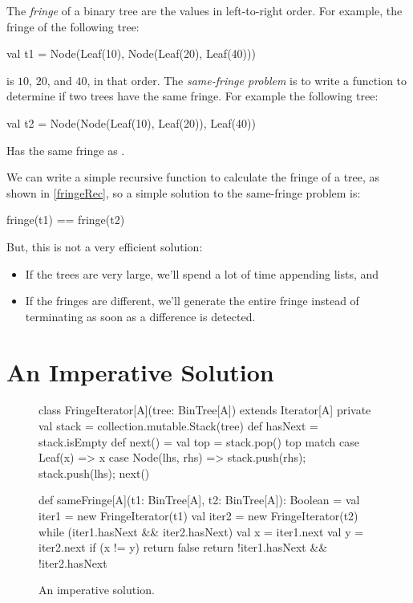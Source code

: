 \documentclass{book}
\begin{document}
The \emph{fringe} of a binary tree are the values in left-to-right order. For
example, the fringe of the following tree:
\begin{scalacode}
val t1 = Node(Leaf(10), Node(Leaf(20), Leaf(40)))
\end{scalacode}
is $10$, $20$, and $40$, in that order. The \emph{same-fringe problem} is to write
a function to determine if two trees have the same fringe. For
example the following tree:
%
\begin{scalacode}
val t2 = Node(Node(Leaf(10), Leaf(20)), Leaf(40))
\end{scalacode}
Has the same fringe as .

We can write a simple recursive function to calculate the fringe of a tree,
as shown in \cref{fringeRec}, so a simple solution to the same-fringe problem
is:
\begin{scalacode}
fringe(t1) == fringe(t2)
\end{scalacode}

But, this is not a very efficient solution:
\begin{itemize}

  \item If the trees are very large, we'll spend a lot of time appending
  lists, and

  \item If the fringes are different, we'll generate the entire fringe instead
  of terminating as soon as a difference is detected.

\end{itemize}

\section{An Imperative Solution}

\begin{figure}
\begin{scalacode}
class FringeIterator[A](tree: BinTree[A]) extends Iterator[A] {
  private val stack = collection.mutable.Stack(tree)
  def hasNext = stack.isEmpty
  def next() = {
    val top = stack.pop()
    top match {
      case Leaf(x) => x
      case Node(lhs, rhs) => { stack.push(rhs); stack.push(lhs); next() }
    }
  }
}

def sameFringe[A](t1: BinTree[A], t2: BinTree[A]): Boolean = {
  val iter1 = new FringeIterator(t1)
  val iter2 = new FringeIterator(t2)
  while (iter1.hasNext && iter2.hasNext) {
    val x = iter1.next
    val y = iter2.next
    if (x != y) {
      return false
    }
  }
  return !iter1.hasNext && !iter2.hasNext
}
\end{scalacode}
\caption{An imperative solution.}
\label{samefringe_imperative}
\end{figure}
\end{document}
